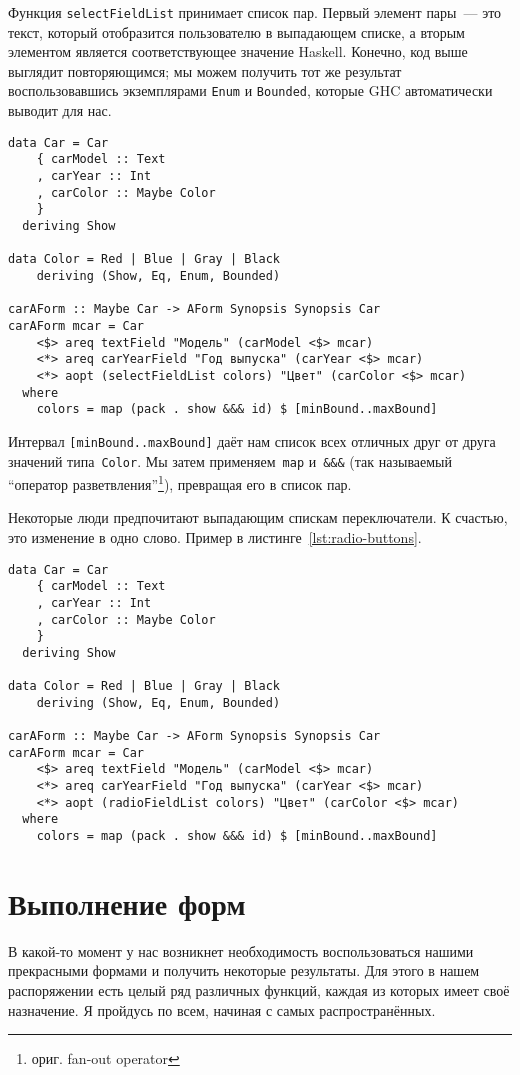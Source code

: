 Функция \lstinline'selectFieldList' принимает список пар. Первый элемент
пары~--- это текст, который отобразится пользователю в выпадающем списке, а
вторым элементом является соответствующее значение Haskell. Конечно, код выше
выглядит повторяющимся; мы можем получить тот же результат воспользовавшись
экземплярами \lstinline'Enum' и \lstinline'Bounded', которые GHC автоматически
выводит для нас.

\begin{lstlisting}[caption={Используя Enum и Bounded}]
data Car = Car
    { carModel :: Text
    , carYear :: Int
    , carColor :: Maybe Color
    }
  deriving Show

data Color = Red | Blue | Gray | Black
    deriving (Show, Eq, Enum, Bounded)

carAForm :: Maybe Car -> AForm Synopsis Synopsis Car
carAForm mcar = Car
    <$> areq textField "Модель" (carModel <$> mcar)
    <*> areq carYearField "Год выпуска" (carYear <$> mcar)
    <*> aopt (selectFieldList colors) "Цвет" (carColor <$> mcar)
  where
    colors = map (pack . show &&& id) $ [minBound..maxBound]
\end{lstlisting}%

Интервал \lstinline'[minBound..maxBound]' даёт нам список всех отличных друг от друга
значений типа~\lstinline'Color'. Мы затем применяем~\lstinline'map'
и~\lstinline'&&&' (так называемый ``оператор разветвления''\footnote{ориг. fan-out operator}),
превращая его в список пар.

Некоторые люди предпочитают выпадающим спискам переключатели.  К счастью, это
изменение в одно слово. Пример в листинге~\ref{lst:radio-buttons}.

\begin{lstlisting}[caption={Переключатели},label={lst:radio-buttons}]
data Car = Car
    { carModel :: Text
    , carYear :: Int
    , carColor :: Maybe Color
    }
  deriving Show

data Color = Red | Blue | Gray | Black
    deriving (Show, Eq, Enum, Bounded)

carAForm :: Maybe Car -> AForm Synopsis Synopsis Car
carAForm mcar = Car
    <$> areq textField "Модель" (carModel <$> mcar)
    <*> areq carYearField "Год выпуска" (carYear <$> mcar)
    <*> aopt (radioFieldList colors) "Цвет" (carColor <$> mcar)
  where
    colors = map (pack . show &&& id) $ [minBound..maxBound]
\end{lstlisting}%

\section{Выполнение форм}
В какой-то момент у нас возникнет необходимость воспользоваться нашими
прекрасными формами и получить некоторые результаты.  Для этого в нашем
распоряжении есть целый ряд различных функций, каждая из которых имеет своё
назначение. Я пройдусь по всем, начиная с самых распространённых.

